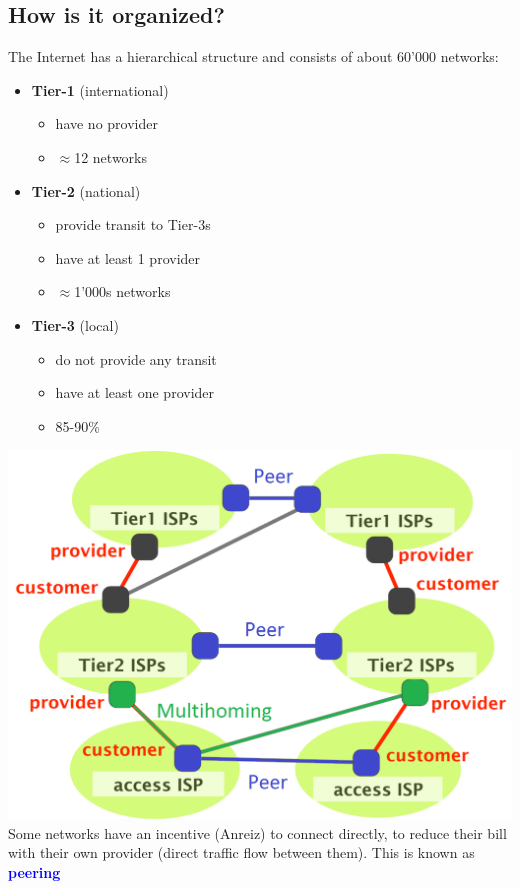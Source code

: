 \documentclass[a4paper, fontsize=8pt, landscape, DIV=1]{scrartcl}
\begin{document}
\begin{multicols*}{4}
			\subsection{How is it organized?}
			\vspace{0.1cm}
				The Internet has a hierarchical structure and consists of about 60'000 networks: 
				\begin{itemize}[noitemsep]
					\item \textbf{Tier-1} (international)
					\begin{itemize}
						\item have no provider 
						\item $\approx$12 networks
					\end{itemize}
					\item \textbf{Tier-2} (national)
					\begin{itemize}
						\item provide transit to Tier-3s
						\item have at least 1 provider 
						\item $\approx$1'000s networks 	
					\end{itemize}
					\item \textbf{Tier-3} (local)
					\begin{itemize}
						\item do not provide any transit
						\item have at least one provider
						\item 85-90\% 
					\end{itemize}
				\end{itemize}
				\includegraphics[width=\columnwidth]{images/Overview/hirarchy.png}
				Some networks have an incentive (Anreiz) to connect directly, to reduce their bill with their own provider (direct traffic flow between them). This is known as \textcolor{Blue}{\textbf{peering}}
	\end{multicols*}
	\setcounter{secnumdepth}{2}
\end{document}
